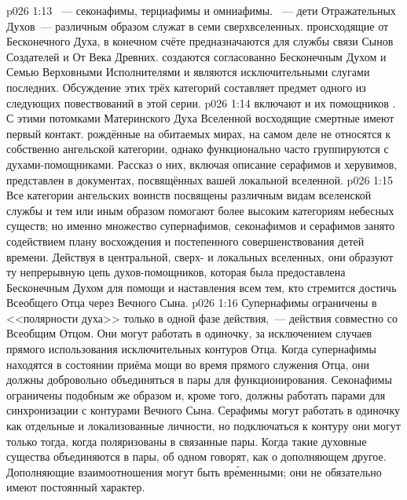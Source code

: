 \vs p026 1:13 ~--- секонафимы, терциафимы и омниафимы. ~--- дети Отражательных Духов~--- различным образом служат в семи сверхвселенных.  происходящие от Бесконечного Духа, в конечном счёте предназначаются для службы связи Сынов Создателей и От Века Древних.  создаются согласованно Бесконечным Духом и Семью Верховными Исполнителями и являются исключительными слугами последних. Обсуждение этих трёх категорий составляет предмет одного из следующих повествований в этой серии.
\vs p026 1:14  включают  и их помощников . С этими потомками Материнского Духа Вселенной восходящие смертные имеют первый контакт.  рождённые на обитаемых мирах, на самом деле не относятся к собственно ангельской категории, однако функционально часто группируются с духами\hyp{}помощниками. Рассказ о них, включая описание серафимов и херувимов, представлен в документах, посвящённых вашей локальной вселенной.
\vs p026 1:15 \pc Все категории ангельских воинств посвящены различным видам вселенской службы и тем или иным образом помогают более высоким категориям небесных существ; но именно множество супернафимов, секонафимов и серафимов занято содействием плану восхождения и постепенного совершенствования детей времени. Действуя в центральной, сверх\hyp{} и локальных вселенных, они образуют ту непрерывную цепь духов\hyp{}помощников, которая была предоставлена Бесконечным Духом для помощи и наставления всем тем, кто стремится достичь Всеобщего Отца через Вечного Сына.
\vs p026 1:16 Супернафимы ограничены в <<полярности духа>> только в одной фазе действия,~--- действия совместно со Всеобщим Отцом. Они могут работать в одиночку, за исключением случаев прямого использования исключительных контуров Отца. Когда супернафимы находятся в состоянии приёма мощи во время прямого служения Отца, они должны добровольно объединяться в пары для функционирования. Секонафимы ограничены подобным же образом и, кроме того, должны работать парами для синхронизации с контурами Вечного Сына. Серафимы могут работать в одиночку как отдельные и локализованные личности, но подключаться к контуру они могут только тогда, когда поляризованы в связанные пары. Когда такие духовные существа объединяются в пары, об одном говорят, как о дополняющем другое. Дополняющие взаимоотношения могут быть вр\'еменными; они не обязательно имеют постоянный характер.
